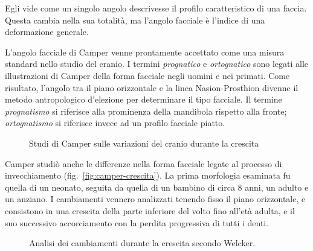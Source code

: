 Egli vide come un singolo angolo descrivesse il profilo caratteristico di una faccia. Questa cambia nella sua totalità, ma l'angolo facciale è l'indice di una deformazione generale.

L'angolo facciale di Camper venne prontamente accettato come una misura standard nello studio del cranio. I termini \textit{prognatico} e \textit{ortognatico} sono legati alle illustrazioni di Camper della forma facciale negli uomini e nei primati. Come risultato, l'angolo tra il piano orizzontale e la linea Nasion-Prosthion divenne il metodo antropologico d'elezione per determinare il tipo facciale. Il termine \textit{prognatismo} si riferisce alla prominenza della mandibola rispetto alla fronte; \textit{ortognatismo} si riferisce invece ad  un profilo facciale piatto.

\begin{figure}
 \centering
 \caption{Studi di Camper sulle variazioni del cranio durante la crescita}
 \label{fig:camper-crescita}
\end{figure}

Camper studiò anche le differenze nella forma facciale legate al processo di invecchiamento (fig.~\vref{fig:camper-crescita}). La prima morfologia esaminata fu quella di un neonato, seguita da quella di un bambino di circa 8 anni, un adulto e un anziano. I cambiamenti vennero analizzati tenendo fisso il piano orizzontale, e consistono in una crescita della parte inferiore del volto fino all'età adulta, e il suo successivo accorciamento con la perdita progressiva di tutti i denti.

\begin{figure}
 \centering
 \caption{Analisi dei cambiamenti durante la crescita secondo Welcker.}
 \label{fig:welcker}
\end{figure}

